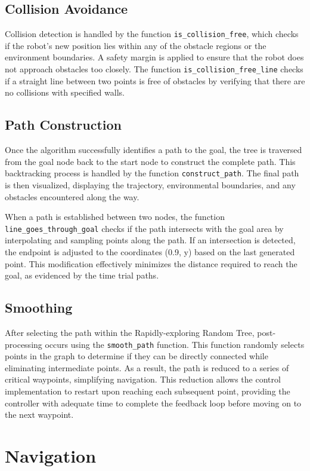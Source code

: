 \documentclass[12pt]{article}
\begin{document}
\subsection{Collision Avoidance}
Collision detection is handled by the function \texttt{is\_collision\_free}, which checks if the robot’s new position lies within any of the obstacle regions or the environment boundaries. A safety margin is applied to ensure that the robot does not approach obstacles too closely. The function \texttt{is\_collision\_free\_line} checks if a straight line between two points is free of obstacles by verifying that there are no collisions with specified walls.

\subsection{Path Construction}
Once the algorithm successfully identifies a path to the goal, the tree is traversed from the goal node back to the start node to construct the complete path. This backtracking process is handled by the function \texttt{construct\_path}. The final path is then visualized, displaying the trajectory, environmental boundaries, and any obstacles encountered along the way.

When a path is established between two nodes, the function \texttt{line\_goes\_through\_goal} checks if the path intersects with the goal area by interpolating and sampling points along the path. If an intersection is detected, the endpoint is adjusted to the coordinates (0.9, y) based on the last generated point. This modification effectively minimizes the distance required to reach the goal, as evidenced by the time trial paths.

\subsection{Smoothing}
After selecting the path within the Rapidly-exploring Random Tree, post-processing occurs using the \texttt{smooth\_path} function. This function randomly selects points in the graph to determine if they can be directly connected while eliminating intermediate points. As a result, the path is reduced to a series of critical waypoints, simplifying navigation. This reduction allows the control implementation to restart upon reaching each subsequent point, providing the controller with adequate time to complete the feedback loop before moving on to the next waypoint.

\section{Navigation}
\end{document}
